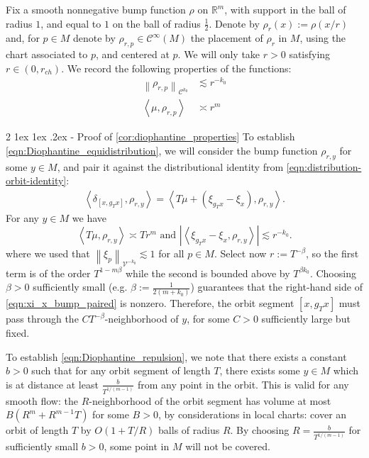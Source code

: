 \documentclass[11pt]{amsart}
\makeatletter
\renewcommand{\subsection}
{\@startsection{subsection}
				     {2}
				     {\z@}%
                     {-3.25ex\@plus -1ex \@minus -.2ex}%
                     {1.5ex \@plus .2ex}%
                     {\normalfont \large \bfseries \sffamily}}%
\newcommand \cC {\mathcal{C}}
\newcommand \cV {\mathcal{V}}
\newcommand \bR {\mathbb{R}}
\newcommand{\ip}[1]{\left\langle#1\right\rangle}
\newcommand{\leqapprox}{\lesssim}
\newcommand{\norm}[1]{\left\|#1\right\|}
\theoremstyle{mytheoremstyle}
\theoremstyle{mydefinitionstyle}
\theoremstyle{mytheoremstyle}
\numberwithin{equation}{section}
\renewcommand{\subsection}
{\@startsection{subsection}
                     {2}
                     {\z@}%
                     {1ex \@plus1ex \@minus.2ex}%
                     {-\fontdimen 2\font }
                     {\normalfont\normalsize\bfseries}}
\theoremstyle{mydefinitionstyle}
\makeatother
\begin{document}
Fix a smooth nonnegative bump function $\rho$ on $\bR^m$, with support in the ball of radius $1$, and equal to $1$ on the ball of radius $\tfrac 12$.
Denote by $\rho_{r}(x):=\rho(x/r)$ and, for $p\in M$ denote by $\rho_{r,p}\in \cC^\infty(M)$ the placement of $\rho_r$ in $M$, using the chart associated to $p$, and centered at $p$.
We will only take $r>0$ satisfying $r\in(0,r_{ch})$.
We record the following properties of the functions:
\begin{align}
	\label{eqn:rho_rp_Ck_norm}
	\norm{\rho_{r,p}}_{\cC^{k_0}} & \leqapprox r^{-k_0}\\
	\ip{\mu,\rho_{r,p}}  & \asymp r^{m}
	\label{eqn:rho_rp_integral}
\end{align}




\subsection{Proof of \autoref{cor:diophantine_properties}}
	\label{ssec:proof_of_diophantine_corollary}
To establish \autoref{eqn:Diophantine_equidistribution}, we will consider the bump function $\rho_{r,y}$ for some $y\in M$, and pair it against the distributional identity from \autoref{eqn:distribution-orbit-identity}:
\begin{align}
  \label{eqn:xi_x_bump_paired}
  \ip{\delta_{[x,g_Tx]}, \rho_{r,y} } = \ip{T \mu + (\xi_{g_Tx} - \xi_x), \rho_{r,y}}.
\end{align}
For any $y\in M$ we have
\[
  \ip{T\mu,\rho_{r,y}}\asymp Tr^{m} \text{ and }
  |\ip{\xi_{g_Tx}-\xi_{x},\rho_{r,y}}|
  \leqapprox r^{-k_0}.
\]
where we used that $\norm{\xi_{p}}_{\cV^{-k_0}}\leqapprox 1$ for all $p\in M$.
Select now $r:=T^{-\beta}$, so the first term is of the order $T^{1-m\beta}$ while the second is bounded above by $T^{\beta k_0}$.
Choosing $\beta>0$ sufficiently small (e.g. $\beta:=\tfrac{1}{2(m+k_0)}$) guarantees that the right-hand side of \autoref{eqn:xi_x_bump_paired} is nonzero.
Therefore, the orbit segment $[x,g_Tx]$ must pass through the $CT^{-\beta}$-neighborhood of $y$, for some $C>0$ sufficiently large but fixed.

To establish \autoref{eqn:Diophantine_repulsion}, we note that there exists a constant $b>0$ such that for any orbit segment of length $T$, there exists some $y\in M$ which is at distance at least $\tfrac{b}{T^{1/(m-1)}}$ from any point in the orbit.
This is valid for any smooth flow: the $R$-neighborhood of the orbit segment has volume at most $B(R^m+R^{m-1}T)$ for some $B>0$, by considerations in local charts: cover an orbit of length $T$ by $O(1 + T/R)$ balls of radius $R$.
By choosing $R=\tfrac{b}{T^{1/(m-1)}}$ for sufficiently small $b>0$, some point in $M$ will not be covered.
\end{document}
